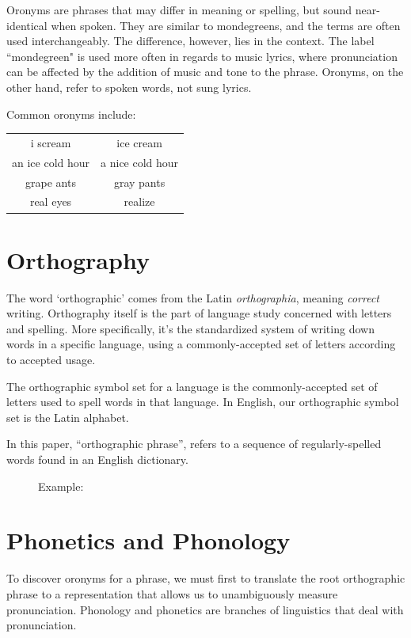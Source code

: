 Oronyms are phrases that may differ in meaning or spelling, but  sound near-identical when spoken.  They are similar to mondegreens, and the terms are often used interchangeably.  The difference, however, lies in the context.  The label ``mondegreen" is used more often in regards to music lyrics, where pronunciation can be affected by the addition of music and tone to the phrase. Oronyms, on the other hand, refer to spoken words, not sung lyrics.\cite{dictionaryOronymDef}

Common oronyms include:
\begin{center}
\begin{tabular}{ cc }
i scream & ice cream \\
an ice cold hour & a nice cold hour \\
grape ants & gray pants \\
real eyes & realize \\
\end{tabular}
\end{center}

\section{Orthography}
\label{vocab:orthography}
The word `orthographic' comes from the Latin \emph{orthographia}, meaning \emph{correct} writing.   Orthography itself is the part of language study concerned with letters and spelling.  More specifically, it's the standardized system of writing down words in a specific language, using a commonly-accepted set of letters according to accepted usage. \cite{dictionaryDotComOrthography} 

The orthographic symbol set for a language is the commonly-accepted set of letters used to spell words in that language.  In English, our orthographic symbol set is the Latin alphabet.

In this paper, ``orthographic phrase'', refers to a sequence of regularly-spelled words found in an English dictionary.

\begin{figure}[h]
\begin{center}
Example:  
\end{center}
\end{figure}


\section{Phonetics and Phonology}
\label{vocab:phoneticsAndPhonology}
To discover oronyms for a phrase, we must first to translate the root orthographic phrase to a representation that allows us to unambiguously measure pronunciation.   Phonology and phonetics are branches of linguistics that deal with pronunciation.

